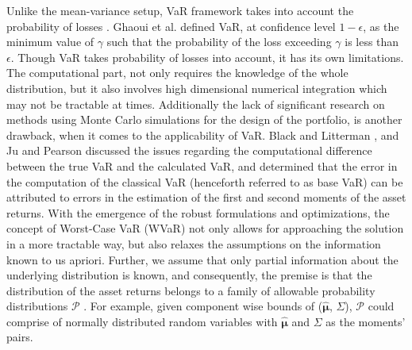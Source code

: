 \documentclass[12pt]{article}
\numberwithin{equation}{section}
\begin{document}
Unlike the mean-variance setup, VaR framework takes into account the probability of losses \cite{Var96}. Ghaoui et al. \cite{Ghaoui03} defined VaR, at confidence level $1-\epsilon$, as the minimum value of $\gamma$ such that the probability of the loss exceeding $\gamma$ is less than $\epsilon$. Though VaR takes probability of losses into account, it has its own limitations. The computational part, not only requires the knowledge of the whole distribution, but it also involves high dimensional numerical integration which may not be tractable at times. Additionally the lack of significant research on methods using Monte Carlo simulations \cite{Var96} for the design of the portfolio, is another drawback, when it comes to the applicability of VaR. Black and Litterman \cite{Black}, and Ju and Pearson \cite{ju98} discussed the issues regarding the computational difference between the true VaR and the calculated VaR, and determined that the error in the computation of the classical VaR (henceforth referred to as base VaR) can be attributed to errors in the estimation of the first and second moments of the asset returns. With the emergence of the robust formulations and optimizations, the concept of Worst-Case VaR (WVaR) not only allows for approaching the solution in a more tractable way, but also relaxes the assumptions on the information known to us apriori.  Further, we assume that only partial information about the underlying distribution is known, and consequently, the premise is that the distribution of the asset returns belongs to a family of allowable probability distributions $\mathcal{P}$ \cite{Ghaoui03}. For example, given component wise bounds of ($\hat{\boldsymbol{\mu}}$,  $\Sigma$), $\mathcal{P}$ could comprise of normally distributed random variables with $\hat{\boldsymbol{\mu}}$ and $\Sigma$ as the moments' pairs.
\end{document}
